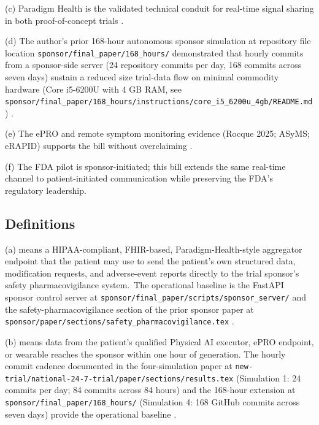 (c) Paradigm Health is the validated technical conduit for real-time signal sharing in both proof-of-concept trials
\cite{fda_rtct_press_2026}.

(d) The author's prior 168-hour autonomous sponsor simulation at repository file location
\texttt{sponsor/final\_paper/168\_hours/} demonstrated that hourly
commits from a sponsor-side server (24 repository commits per day, 168 commits
across seven days) sustain a reduced size trial-data flow on minimal
commodity hardware (Core i5-6200U with 4 GB RAM, see
\texttt{sponsor/final\_paper/168\_hours/instructions/core\_i5\_6200u\_4gb/README.md})
\cite{kawchak_2026_19396256}.

(e) The ePRO and remote symptom monitoring evidence (Rocque 2025;
ASyMS; eRAPID) supports the bill without overclaiming
\cite{rocque2025remote_symptom_monitoring, kearney2009asyms,
maguire2017esmart, absolom2021erapid}.

(f) The FDA pilot is sponsor-initiated; this bill extends the same
real-time channel to patient-initiated communication while
preserving the FDA's regulatory leadership.

\subsection{Definitions}

\hspace{0.5cm} (a)  means a HIPAA-compliant, FHIR-based, Paradigm-Health-style aggregator endpoint
that the patient may use to send the patient's own structured data,
modification requests, and adverse-event reports directly to the
trial sponsor's safety pharmacovigilance system.\ The operational
baseline is the FastAPI sponsor control server at
\texttt{sponsor/final\_paper/scripts/sponsor\_server/} and the
safety-pharmacovigilance section of the prior sponsor paper at
\texttt{sponsor/paper/sections/safety\_pharmacovigilance.tex}
\cite{kawchak_2026_19396256}.

(b)  means data from the patient's qualified
Physical AI executor, ePRO endpoint, or wearable reaches the
sponsor within one hour of generation. The hourly commit cadence
documented in the four-simulation paper at
\texttt{new-trial/national-24-7-trial/paper/sections/results.tex}
(Simulation 1: 24 commits per day; 84 commits across 84 hours) and
the 168-hour extension at \texttt{sponsor/final\_paper/168\_hours/}
(Simulation 4: 168 GitHub commits across seven days) provide the
operational baseline \cite{kawchak_2026_19994945,
kawchak_2026_19396256}.

